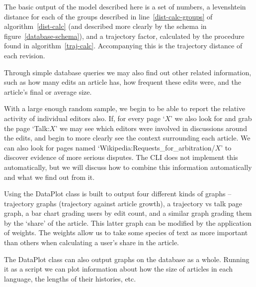 The basic output of the model described here is a set of numbers, a
levenshtein distance for each of the groups described in
line~\ref{dist-calc-groups} of algorithm~\ref{dist-calc} (and
described more clearly by the schema in figure~\ref{database-schema}),
and a trajectory factor, calculated by the procedure found in
algorithm~\ref{traj-calc}. Accompanying this is the trajectory
distance of each revision.

Through simple database queries we may also find out other related
information, such as how many edits an article has, how frequent these
edits were, and the article's final or average size.

With a large enough random sample, we begin to be able to report the
relative activity of individual editors also. If, for every page `$X$'
we also look for and grab the page `Talk:$X$' we may see which editors
were involved in discussions around the edits, and begin to more
clearly see the context surrounding each article. We can also look for
pages named `Wikipedia:Requests\_for\_arbitration/$X$' to discover
evidence of more serious disputes. The CLI does not implement this
automatically, but we will discuss how to combine this information
automatically and what we find out from it.

Using the DataPlot class is built to output four different kinds of
graphs -- trajectory graphs (trajectory against article growth), a
trajectory vs talk page graph, a bar chart grading users by edit
count, and a similar graph grading them by the `share' of the
article. This latter graph can be modified by the application of
weights. The weights allow us to take some species of text as more
important than others when calculating a user's share in the article.

The DataPlot class can also output graphs on the database as a
whole. Running it as a script we can plot information about how the
size of articles in each language, the lengths of their histories,
etc.
